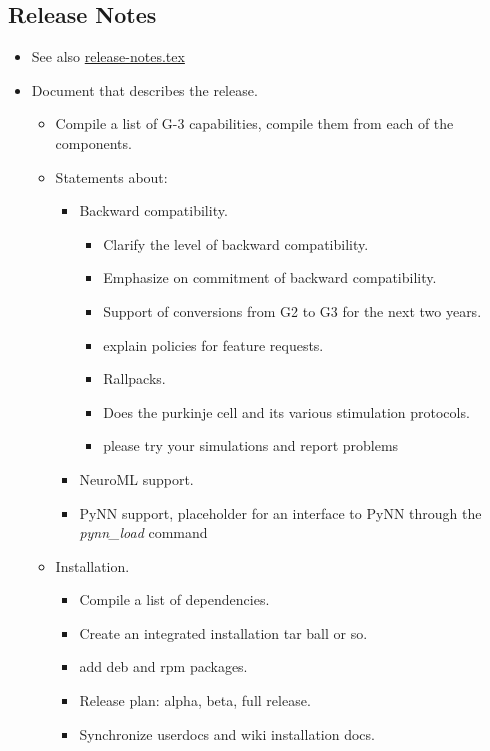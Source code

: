 \documentclass[12pt]{article}
\begin{document}
\subsection{Release Notes}

\begin{itemize}
\item See also \href{../release-notes/release-notes.tex}{release-notes.tex}
\item Document that describes the release.
  \begin{itemize}
  \item Compile a list of G-3 capabilities, compile them from each of the components.
  \item Statements about:
    \begin{itemize}
    \item Backward compatibility.
      \begin{itemize}
      \item Clarify the level of backward compatibility. 
      \item Emphasize on commitment of backward compatibility.
      \item Support of conversions from G2 to G3 for the next two years.
      \item explain policies for feature requests.
      \item Rallpacks.
      \item Does the purkinje cell and its various stimulation protocols.
      \item please try your simulations and report problems
      \end{itemize}
    \item NeuroML support.
    \item PyNN support, placeholder for an interface to PyNN through the
      {\it pynn\_load} command
    \end{itemize}
  \item Installation.
    \begin{itemize}
    \item Compile a list of dependencies.
    \item Create an integrated installation tar ball or so.
    \item add deb and rpm packages.
    \item Release plan: alpha, beta, full release.
    \item Synchronize userdocs and wiki installation docs.

\end{itemize}
\end{itemize}
\end{itemize}
\end{document}
